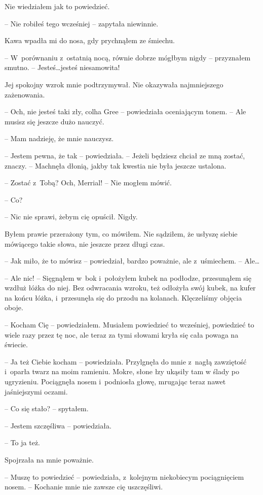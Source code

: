 \documentclass[oneside,polish,11pt,sfheadings]{mwbk}
\begin{document}
Nie wiedziałem jak to powiedzieć.

-- Nie robiłeś tego wcześniej -- zapytała niewinnie.

Kawa wpadła mi do nosa, gdy prychnąłem ze śmiechu.

-- W~porównaniu z~ostatnią nocą, równie dobrze mógłbym nigdy -- przyznałem
smutno. -- Jesteś\ldots jesteś niesamowita!

Jej spokojny wzrok mnie podtrzymywał. Nie okazywała najmniejszego
zażenowania. 

-- Och, nie jesteś taki zły, colha Gree -- powiedziała
oceniającym tonem. -- Ale musisz się jeszcze dużo nauczyć.

-- Mam nadzieję, że mnie nauczysz.

-- Jestem pewna, że tak -- powiedziała. -- Jeżeli będziesz chciał ze mną
zostać, znaczy. -- Machnęła dłonią, jakby tak kwestia nie była jeszcze
ustalona.

-- Zostać z~Tobą? Och, Merrial! -- Nie mogłem mówić.

-- Co?

-- Nic nie sprawi, żebym cię opuścił. Nigdy.

Byłem prawie przerażony tym, co mówiłem. Nie sądziłem, że usłyszę siebie
mówiącego takie słowa, nie jeszcze przez długi czas.

-- Jak miło, że to mówisz -- powiedział, bardzo poważnie, ale z~uśmiechem.
-- Ale\ldots

-- Ale nic! -- Sięgnąłem w~bok i~położyłem kubek na podłodze, przesunąłem
się wzdłuż łóżka do niej. Bez odwracania wzroku, też odłożyła swój
kubek, na kufer na końcu łóżka, i~przesunęła się do przodu na kolanach.
Klęczeliśmy objęcia oboje.

-- Kocham Cię -- powiedziałem. Musiałem powiedzieć to wcześniej,
powiedzieć to wiele razy przez tę noc, ale teraz za tymi słowami kryła
się cała powaga na świecie.

-- Ja też Ciebie kocham -- powiedziała. Przylgnęła do mnie z~nagłą
zawziętość i~oparła twarz na moim ramieniu. Mokre, słone łzy ukąsiły tam
w ślady po ugryzieniu. Pociągnęła nosem i~podniosła głowę, mrugając
teraz nawet jaśniejszymi oczami.

-- Co się stało? -- spytałem.

-- Jestem szczęśliwa -- powiedziała.

-- To ja też.

Spojrzała na mnie poważnie. 

-- Muszę to powiedzieć -- powiedziała, z~kolejnym niekobiecym pociągnięciem nosem. -- Kochanie mnie nie zawsze cię
uszczęśliwi.
\end{document}
